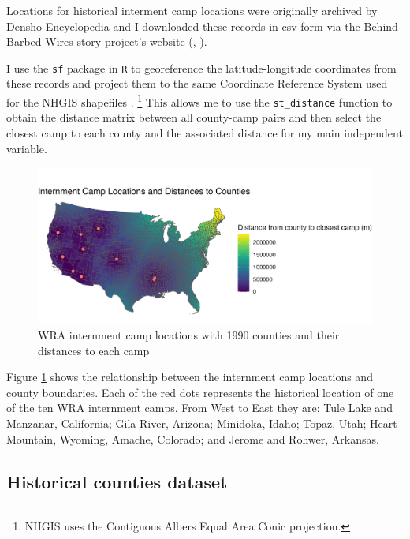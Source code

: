 \documentclass[12pt]{article}
\begin{document}
Locations for historical interment camp locations were originally archived by
\href{http://encyclopedia.densho.org/War_Relocation_Authority/\#Planning_the_Camps}{Densho
Encyclopedia} and I downloaded these records in csv form via the
\href{https://www.arcgis.com/home/item.html?id=69183af8d45d4f46a9dc4eba99440891}{Behind
Barbed Wires} story project's website
(\cite{chrkan_behind_2019}, \cite{robinson_war_2023}).

I use the \texttt{sf} package in \texttt{R} to georeference the latitude-longitude coordinates from these records and project them to the same Coordinate Reference System used for the NHGIS shapefiles \citep{pebesma_simple_2018}.
\footnote{NHGIS uses the Contiguous Albers Equal Area Conic projection.}
This allows me to use the \texttt{st\_distance} function to obtain the distance matrix between all county-camp pairs and then select the closest camp to each county and the associated distance for my main independent variable.

\begin{figure}[H]
    \centering
    \includegraphics[width=1.0\textwidth]{figures/countymap.png}
    \caption{WRA internment camp locations with 1990 counties and their distances to each camp}
    \label{fig:countymap}
\end{figure}

Figure \ref{fig:countymap} shows the relationship between the internment camp locations and county boundaries. 
Each of the red dots represents the historical location of one of the ten WRA internment camps. 
From West to East they are:
Tule Lake and Manzanar, California;
Gila River, Arizona;
Minidoka, Idaho;
Topaz, Utah;
Heart Mountain, Wyoming,
Amache, Colorado;
and
Jerome and Rohwer, Arkansas.

\subsection{Historical counties
dataset}\label{historical-counties-dataset}

\end{document}
